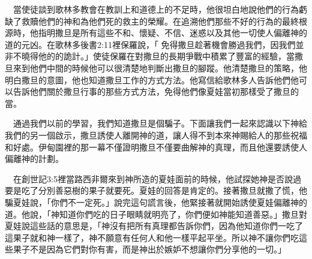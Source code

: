 \documentclass{book}
\begin{document}
\begin{center}
\noindent{}
\end{center}

　當使徒談到歌林多教會在教訓上和道德上的不足時，他很坦白地說他們的行為虧缺了救贖他們的神和為他們死的救主的榮耀。在追溯他們那些不好的行為的最終根源時，他指明撒旦是所有這些不和、懷疑、不信、迷惑以及其他一切使人偏離神的道的元凶。在歌林多後書2:11裡保羅說，「 免得撒旦趁著機會勝過我們，因我們並非不曉得他的的詭計。」使徒保羅在對撒旦的長期爭戰中積累了豐富的經驗，當撒旦來到他們中間的時候他可以很清楚地判斷出撒旦的腳蹤。他清楚撒旦的策略，他明白撒旦的意圖，他也知道撒旦工作的方式方法。他寫信給歌林多人告訴他們他可以告訴他們關於撒旦行事的那些方式方法，免得他們像夏娃當初那樣受了撒旦的當。

　通過我們以前的學習，我們知道撒旦是個騙子。下面讓我們一起來認識以下神給我們的另一個啟示，撒旦誘使人離開神的道，讓人得不到本來神賜給人的那些祝福和好處。伊甸園裡的那一幕不僅證明撒旦不僅要曲解神的真理，而且他還要誘使人偏離神的計劃。

　在創世記3:5裡當路西非爾來到神所造的夏娃面前的時候，他試探她神是否說過要是吃了分別善惡樹的果子就要死。夏娃的回答是肯定的。接著撒旦就撒了慌，他騙夏娃說，「你們不一定死。」說完這句謊言後，他緊接著就開始誘使夏娃偏離神的道。他說，「神知道你們吃的日子眼睛就明亮了，你們便如神能知道善惡。」撒旦對夏娃說這些話的意思是，「神沒有把所有真理都告訴你們，因為他知道你們一吃了這果子就和神一樣了，神不願意有任何人和他一樣平起平坐。所以神不讓你們吃這些果子不是因為它們對你有害，而是神出於嫉妒不想讓你們分享他的一切。」
\end{document}
